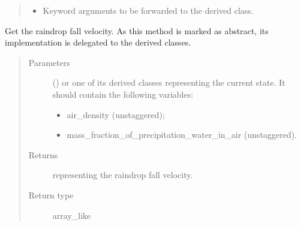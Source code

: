 \documentclass[letterpaper,10pt,english]{sphinxmanual}
\begin{document}
\begin{fulllineitems}
\begin{fulllineitems}
\begin{quote}
\begin{description}
\begin{itemize}
\item {} 
 \textendash{} Keyword arguments to be forwarded to the derived class.

\end{itemize}

\end{description}\end{quote}

\end{fulllineitems}


\begin{fulllineitems}
\label{\detokenize{api:tasmania.parameterizations.slow_tendencies.SlowTendencyMicrophysics.get_raindrop_fall_velocity}}
Get the raindrop fall velocity.
As this method is marked as abstract, its implementation is delegated to the derived classes.
\begin{quote}\begin{description}
\item[{Parameters}] \leavevmode
{} () \textendash{} 
{\hyperref[\detokenize{api:tasmania.storages.grid_data.GridData}]{}} or one of its derived classes representing the current state.
It should contain the following variables:
\begin{itemize}
\item {} 
air\_density (unstaggered);

\item {} 
mass\_fraction\_of\_precipitation\_water\_in\_air (unstaggered).

\end{itemize}


\item[{Returns}] \leavevmode
{} representing the raindrop fall velocity.

\item[{Return type}] \leavevmode
array\_like

\end{description}\end{quote}

\end{fulllineitems}


\end{fulllineitems}
\end{document}
